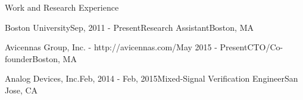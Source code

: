 \begin{rSection} {Work and Research Experience}
  \begin{rSubsection}{Boston University}{Sep, 2011 - Present}{Research Assistant}{Boston, MA}
  \end{rSubsection}

  \begin{rSubsection}{Avicennas Group, Inc. - http://avicennas.com/}{May 2015 - Present}{CTO/Co-founder}{Boston, MA}
  \end{rSubsection}

  \begin{rSubsection}{Analog Devices, Inc.}{Feb, 2014 - Feb, 2015}{Mixed-Signal Verification Engineer}{San Jose, CA}
  \end{rSubsection}


\end{rSection}
